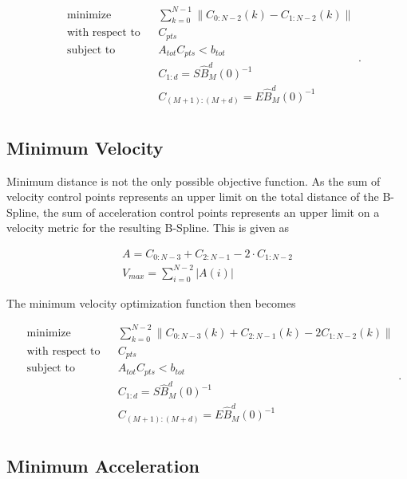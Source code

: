 \begin{equation}\label{eq:controlPointsOptimizationDistance}
    \begin{aligned}
        &\text{minimize} && \sum_{k=0}^{N-1} \|C_{0:N-2}(k) - C_{1:N-2}(k)\|\\
        &\text{with respect to} && C_{pts}\\
        &\text{subject to} && A_{tot} C_{pts} < b_{tot}\\
        &&& C_{1:d} = S \hat{B}_M^d(0)^{-1}\\
        &&& C_{(M+1):(M+d)} = E \hat{B}_M^d(0)^{-1}\\
    \end{aligned}.
\end{equation}

\subsection{Minimum Velocity}

Minimum distance is not the only possible objective function. 
As the sum of velocity control points represents an upper limit on the total distance of the B-Spline, the sum of acceleration control points represents an upper limit on a velocity metric for the resulting B-Spline. 
This is given as

\begin{align}
    A = C_{0:N-3} + C_{2:N-1} - 2 \cdot C_{1:N-2}\\
    V_{max} = 
    \sum_{i=0}^{N-2} |A(i)|
\end{align}

The minimum velocity optimization function then becomes

\begin{equation}\label{eq:controlPointsOptimizationVelocity}
    \begin{aligned}
        &\text{minimize} && \sum_{k=0}^{N-2} \|C_{0:N-3}(k) + C_{2:N-1}(k) - 2 C_{1:N-2}(k)\|\\
        &\text{with respect to} && C_{pts}\\
        &\text{subject to} && A_{tot} C_{pts} < b_{tot}\\
        &&& C_{1:d} = S \hat{B}_M^d(0)^{-1}\\
        &&& C_{(M+1):(M+d)} = E \hat{B}_M^d(0)^{-1}\\
    \end{aligned}.
\end{equation}

\subsection{Minimum Acceleration}

